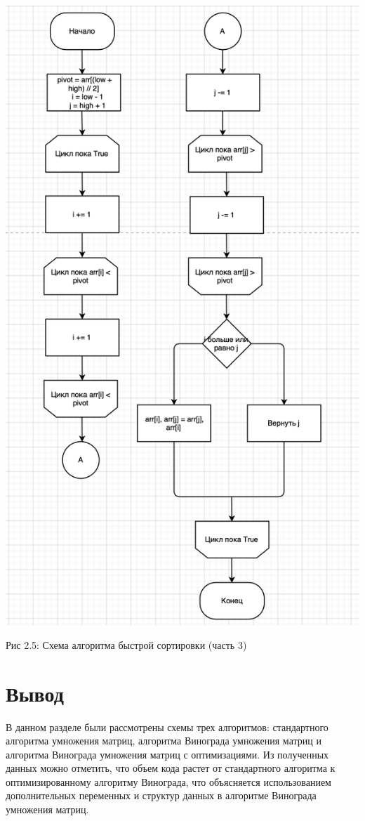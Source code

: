 \documentclass[12pt]{report}
\begin{document}
\begin{center}
		\includegraphics[scale=0.7]{schema/Partition.png}
		
			Рис 2.5: Схема алгоритма быстрой сортировки (часть 3)
\end{center}

\section{Вывод}
В данном разделе были рассмотрены схемы трех алгоритмов: стандартного алгоритма умножения матриц, алгоритма Винограда умножения матриц и алгоритма Винограда умножения матриц с оптимизациями. Из полученных данных можно отметить, что объем кода растет от стандартного алгоритма к оптимизированному алгоритму Винограда, что объясняется использованием дополнительных переменных и структур данных в алгоритме Винограда умножения матриц.
\end{document}

